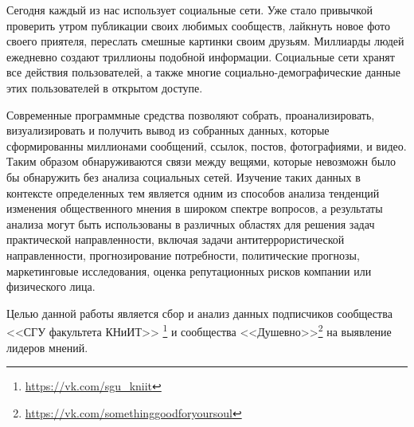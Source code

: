 Сегодня каждый из нас использует социальные сети. Уже стало привычкой проверить утром публикации своих любимых сообществ, лайкнуть новое фото своего приятеля, переслать смешные картинки своим друзьям. Миллиарды людей ежедневно создают триллионы подобной информации. Социальные сети хранят все действия пользователей, а также многие социально-демографические данные этих пользователей в открытом доступе. 

Современные программные средства позволяют собрать, проанализировать, визуализировать и получить вывод из собранных данных, которые сформированны миллионами сообщений, ссылок, постов, фотографиями, и видео. Таким образом обнаруживаются связи между вещями, которые невозможн было бы обнаружить без анализа социальных сетей. Изучение таких данных в контексте определенных тем является одним из способов анализа тенденций изменения общественного
мнения в широком спектре вопросов, а результаты
анализа могут быть использованы в различных областях для решения задач практической направленности, включая задачи антитеррористической
направленности, прогнозирование потребности,
политические прогнозы, маркетинговые исследования, оценка репутационных рисков компании
или физического лица.\cite{Tomksk_researh}

Целью данной работы является сбор и анализ данных подписчиков сообщества <<СГУ факультета КНиИТ>> \footnote{\url{https://vk.com/sgu_kniit}} и сообщества <<Душевно>>\footnote{\url{https://vk.com/somethinggoodforyoursoul}} на выявление лидеров мнений.

